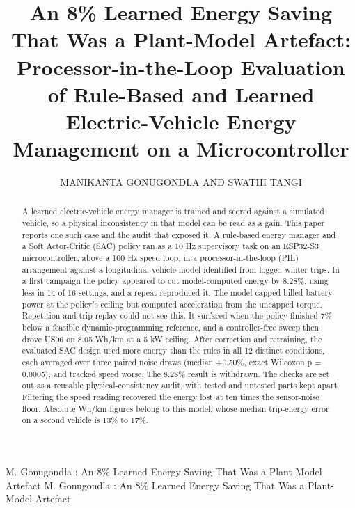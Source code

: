 \documentclass{ieeeaccess}
\begin{document}

\title{An 8\% Learned Energy Saving That Was a Plant-Model Artefact: Processor-in-the-Loop Evaluation of Rule-Based and Learned Electric-Vehicle Energy Management on a Microcontroller}
\author{\uppercase{Manikanta Gonugondla} AND \uppercase{Swathi Tangi}}
\address[1]{[Affiliation to be confirmed by the authors before submission]}

\markboth
{M. Gonugondla \headeretal: An 8\% Learned Energy Saving That Was a Plant-Model Artefact}
{M. Gonugondla \headeretal: An 8\% Learned Energy Saving That Was a Plant-Model Artefact}


\begin{abstract}
A learned electric-vehicle energy manager is trained and scored against a simulated vehicle, so a physical inconsistency in that model can be read as a gain. This paper reports one such case and the audit that exposed it. A rule-based energy manager and a Soft Actor-Critic (SAC) policy ran as a 10 Hz supervisory task on an ESP32-S3 microcontroller, above a 100 Hz speed loop, in a processor-in-the-loop (PIL) arrangement against a longitudinal vehicle model identified from logged winter trips. In a first campaign the policy appeared to cut model-computed energy by 8.28\%, using less in 14 of 16 settings, and a repeat reproduced it. The model capped billed battery power at the policy's ceiling but computed acceleration from the uncapped torque. Repetition and trip replay could not see this. It surfaced when the policy finished 7\% below a feasible dynamic-programming reference, and a controller-free sweep then drove US06 on 8.05 Wh/km at a 5 kW ceiling. After correction and retraining, the evaluated SAC design used more energy than the rules in all 12 distinct conditions, each averaged over three paired noise draws (median +0.50\%, exact Wilcoxon p = 0.0005), and tracked speed worse. The 8.28\% result is withdrawn. The checks are set out as a reusable physical-consistency audit, with tested and untested parts kept apart. Filtering the speed reading recovered the energy lost at ten times the sensor-noise floor. Absolute Wh/km figures belong to this model, whose median trip-energy error on a second vehicle is 13\% to 17\%.
\end{abstract}
\end{document}
